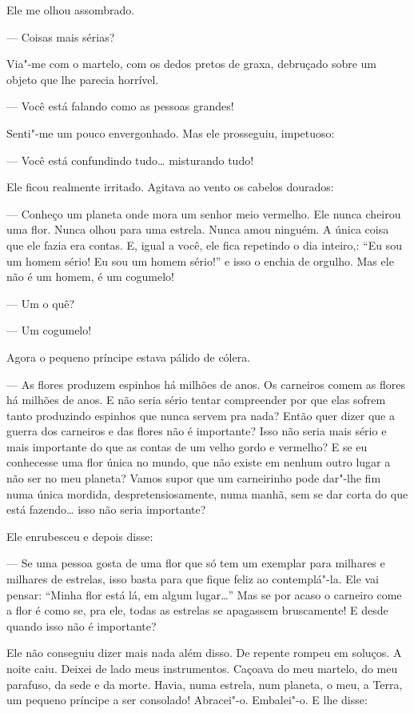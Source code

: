 \begin{Parallel}[p]{}{}
{Ele me olhou assombrado.

--- Coisas mais sérias?

Via"-me com o martelo, com os dedos pretos de graxa, debruçado sobre um
objeto que lhe parecia horrível.

--- Você está falando como as pessoas grandes!

Senti"-me um pouco envergonhado. Mas ele prosseguiu, impetuoso:

--- Você está confundindo tudo\ldots{} misturando tudo!

Ele ficou realmente irritado. Agitava ao vento os cabelos dourados:

--- Conheço um planeta onde mora um senhor meio vermelho. Ele nunca
cheirou uma flor. Nunca olhou para uma estrela. Nunca amou ninguém. A
única coisa que ele fazia era contas. E, igual a você, ele fica
repetindo o dia inteiro,: ``Eu sou um homem sério! Eu sou um homem
sério!'' e isso o enchia de orgulho. Mas ele não é um homem, é um
cogumelo!

--- Um o quê?

--- Um cogumelo!

Agora o pequeno príncipe estava pálido de cólera.

--- As flores produzem espinhos há milhões de anos. Os carneiros comem as
flores há milhões de anos. E não seria sério tentar compreender por que
elas sofrem tanto produzindo espinhos que nunca servem pra nada? Então
quer dizer que a guerra dos carneiros e das flores não é importante?
Isso não seria mais sério e mais importante do que as contas de um velho
gordo e vermelho? E se eu conhecesse uma flor única no mundo, que não
existe em nenhum outro lugar a não ser no meu planeta? Vamos supor que
um carneirinho pode dar"-lhe fim numa única mordida, despretensiosamente,
numa manhã, sem se dar corta do que está fazendo\ldots{} isso não seria
importante?

Ele enrubesceu e depois disse:

--- Se uma pessoa gosta de uma flor que só tem um exemplar para milhares e
milhares de estrelas, isso basta para que fique feliz ao contemplá"-la.
Ele vai pensar: ``Minha flor está lá, em algum lugar\ldots{}'' Mas se por
acaso o carneiro come a flor é como se, pra ele, todas as estrelas se
apagassem bruscamente! E desde quando isso não é importante?

Ele não conseguiu dizer mais nada além disso. De repente rompeu em
soluços. A noite caiu. Deixei de lado meus instrumentos. Caçoava do meu
martelo, do meu parafuso, da sede e da morte. Havia, numa estrela, num
planeta, o meu, a Terra, um pequeno príncipe a ser consolado! Abracei"-o.
Embalei"-o. E lhe disse:

}
\end{Parallel}
